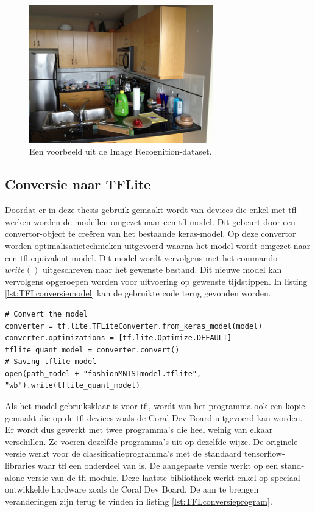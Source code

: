 		\begin{figure}
			\centering
			\includegraphics[width=80mm]{afbeeldingen/ImRec1.jpg}
			\caption{Een voorbeeld uit de Image Recognition-dataset.}
			\label{fig:ImRec1}
		\end{figure}

	\subsection{Conversie naar TFLite} \label{prg:ConversieTFL}
		Doordat er in deze thesis gebruik gemaakt wordt van devices die enkel met \gls{tfl} werken worden de modellen omgezet naar een \gls{tfl}-model. Dit gebeurt door een convertor-object te cre\"eren van het bestaande keras-model. Op deze convertor worden optimalisatietechnieken uitgevoerd waarna het model wordt omgezet naar een \gls{tfl}-equivalent model. Dit model wordt vervolgens met het commando $write()$ uitgeschreven naar het gewenste bestand. Dit nieuwe model kan vervolgens opgeroepen worden voor uitvoering op gewenste tijdstippen. In listing \ref{lst:TFLconversiemodel} kan de gebruikte code terug gevonden worden.
	\begin{lstlisting}[caption={Converteren naar een \gls{tfl}-model.}, captionpos=b,label={lst:TFLconversiemodel}]
# Convert the model
converter = tf.lite.TFLiteConverter.from_keras_model(model)
converter.optimizations = [tf.lite.Optimize.DEFAULT]
tflite_quant_model = converter.convert()
# Saving tflite model
open(path_model + "fashionMNISTmodel.tflite", "wb").write(tflite_quant_model)
\end{lstlisting}	
	
		Als het model gebruiksklaar is voor \gls{tfl}, wordt van het programma ook een kopie gemaakt die op de \gls{tfl}-devices zoals de Coral Dev Board uitgevoerd kan worden. Er wordt dus gewerkt met twee programma's die heel weinig van elkaar verschillen. Ze voeren dezelfde programma's uit op dezelfde wijze. De originele versie werkt voor de classificatieprogramma's met de standaard tensorflow-libraries waar \gls{tfl} een onderdeel van is. De aangepaste versie werkt op een stand-alone versie van de \gls{tfl}-module. Deze laatste bibliotheek werkt enkel op speciaal ontwikkelde hardware zoals de Coral Dev Board. De aan te brengen veranderingen zijn terug te vinden in listing \ref{lst:TFLconversieprogram}. \\
		
